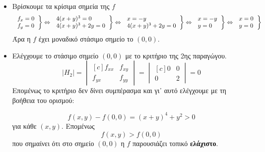 \begin{enumerate}
\begin{itemize}
			\item Βρίσκουμε τα κρίσιμα σημεία της  $f$
				\[
					\left.
						\begin{tabular}{l}
							$	f_{x} = 0$ \\
							$	f_{y} = 0$
						\end{tabular}
					\right\} \Leftrightarrow 
					\left.
						\begin{tabular}{l}
							$	4(x+y)^{3} = 0$ \\
							$	4(x+y)^{3} + 2y = 0$
						\end{tabular}
					\right\} \Leftrightarrow  
					\left.
						\begin{tabular}{l}
							$ x=-y	$ \\
							$	4(x+y)^{3}+2y = 0$
						\end{tabular}
					\right\} \Leftrightarrow  
					\left.
						\begin{tabular}{l}
							$ x=-y	$ \\
							$ y=0	$
						\end{tabular}
					\right\} \Leftrightarrow  
					\left.
						\begin{tabular}{l}
							$ x=0	$ \\
							$ y=0	$
						\end{tabular}
					\right\}   
				\] 
				Άρα η  $f$  έχει μοναδικό στάσιμο σημείο το  $ (0,0) $.

			\item Ελέγχουμε το στάσιμο σημείο  $ (0,0) $ με το κριτήριο της 2ης παραγώγου. 
				\[
					|H_{2}|=	\begin{vmatrix*}[c]
						f_{xx} & f_{xy} \\
						f_{yx} & f_{yy}
					\end{vmatrix*} = 
					\begin{vmatrix*}[c]
						0 & 0 \\
						0 & 2
					\end{vmatrix*} = 0
				\] 
				Επομένως το κριτήριο δεν δίνει συμπέρασμα και γι᾽ αυτό ελέγχουμε με τη βοήθεια του ορισμού:

				\[f(x,y) - f(0,0) = (x+y)^{4} + y^{2} > 0 \]  για κάθε  $ (x,y) $.  Επομένως
				\[
					f(x,y)>f(0,0) 
				\]  που σημαίνει ότι στο σημείο  $ (0,0) $ η  $f$  παρουσιάζει τοπικό \textbf{ελάχιστο}.

		\end{itemize}


\end{enumerate}
